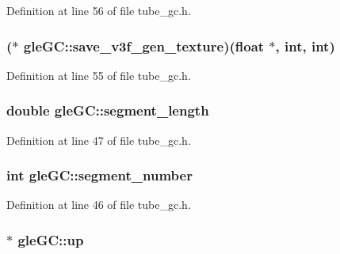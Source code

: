 Definition at line 56 of file tube\-\_\-gc.\-h.

\hypertarget{structgle_g_c_a22259b3789a8e6e15819fa65baf8874d}{
\subsubsection[{save\-\_\-v3f\-\_\-gen\-\_\-texture}]{($\ast$ gle\-G\-C\-::save\-\_\-v3f\-\_\-gen\-\_\-texture)(float $\ast$, int, int)}}\label{structgle_g_c_a22259b3789a8e6e15819fa65baf8874d}


Definition at line 55 of file tube\-\_\-gc.\-h.

\hypertarget{structgle_g_c_ab77affaea620610a33143998a4ec350a}{
\subsubsection[{segment\-\_\-length}]{\setlength{\rightskip}{0pt plus 5cm}double gle\-G\-C\-::segment\-\_\-length}}\label{structgle_g_c_ab77affaea620610a33143998a4ec350a}


Definition at line 47 of file tube\-\_\-gc.\-h.

\hypertarget{structgle_g_c_a39b855ae551de8c4168faba7dc5002df}{
\subsubsection[{segment\-\_\-number}]{\setlength{\rightskip}{0pt plus 5cm}int gle\-G\-C\-::segment\-\_\-number}}\label{structgle_g_c_a39b855ae551de8c4168faba7dc5002df}


Definition at line 46 of file tube\-\_\-gc.\-h.

\hypertarget{structgle_g_c_a0588c2d0550bff01586b7e3b3e5b7899}{
\subsubsection[{up}]{$\ast$ gle\-G\-C\-::up}}\label{structgle_g_c_a0588c2d0550bff01586b7e3b3e5b7899}



